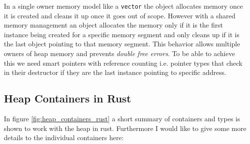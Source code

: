 In a single owner memory model like a \lstinline{vector} the object allocates memory once it is created and cleans it up once it goes out of scope. However with a shared memory management an object allocates the memory only if it is the first instance being created for a specific memory segment and only cleans up if it is the last object pointing to that memory segment. This behavior allows multiple owners of heap memory and prevents \textit{double free errors}. To be able to achieve this we need smart pointers with reference counting i.e. pointer types that check in their destructor if they are the last instance pointing to specific address.

\subsection{Heap Containers in Rust}

In figure \ref{fig:heap_containers_rust} a short summary of containers and types is shown to work with the heap in rust. Furthermore I would like to give some more details to the individual containers here:

